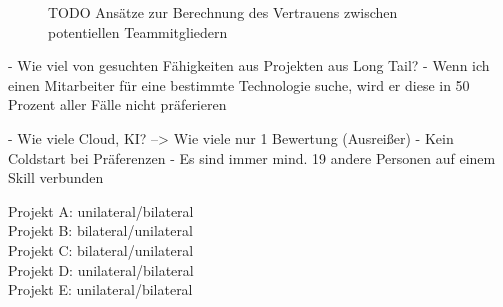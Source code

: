 \begin{figure}[h]
	
	\caption{TODO Ansätze zur Berechnung des Vertrauens zwischen potentiellen Teammitgliedern \cite[S. 5]{malinowski:2005}}
	\label{fig:ergebnisse:analyse:abb6}
\end{figure}


\newpage

- Wie viel von gesuchten Fähigkeiten aus Projekten aus Long Tail?
- Wenn ich einen Mitarbeiter für eine bestimmte Technologie suche, wird er diese in 50 Prozent aller Fälle nicht präferieren

- Wie viele Cloud, KI? --> Wie viele nur 1 Bewertung (Ausreißer)
- Kein Coldstart bei Präferenzen
- Es sind immer mind. 19 andere Personen auf einem Skill verbunden

Projekt A: unilateral/bilateral\\
Projekt B: bilateral/unilateral\\
Projekt C: bilateral/unilateral\\
Projekt D: unilateral/bilateral\\
Projekt E: unilateral/bilateral

